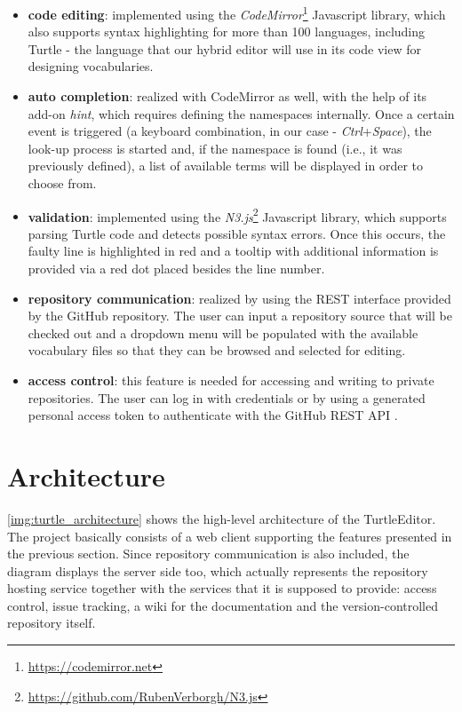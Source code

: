 \begin{itemize}
	\item \textbf{code editing}: implemented using the \textit{CodeMirror}\footnote{\url{https://codemirror.net}} Javascript library, which also supports syntax highlighting for more than 100 languages, including Turtle - the language that our hybrid editor will use in its code view for designing vocabularies.
	\item \textbf{auto completion}: realized with CodeMirror as well, with the help of its add-on \textit{hint}, which requires defining the namespaces internally. Once a certain event is triggered (a keyboard combination, in our case - \textit{Ctrl}+\textit{Space}), the look-up process is started and, if the namespace is found (i.e., it was previously defined), a list of available terms will be displayed in order to choose from.
	\item \textbf{validation}: implemented using the \textit{N3.js}\footnote{\url{https://github.com/RubenVerborgh/N3.js}} Javascript library, which supports parsing Turtle code and detects possible syntax errors. Once this occurs, the faulty line is highlighted in red and a tooltip with additional information is provided via a red dot placed besides the line number.
	\item \textbf{repository communication}: realized by using the REST interface provided by the GitHub repository. The user can input a repository source that will be checked out and a dropdown menu will be populated with the available vocabulary files so that they can be browsed and selected for editing.
	\item \textbf{access control}: this feature is needed for accessing and writing to private repositories. The user can log in with credentials or by using a generated personal access token to authenticate with the GitHub REST API \cite{Petersen2016}.
\end{itemize}


\section {Architecture}

\autoref{img:turtle_architecture} shows the high-level architecture of the TurtleEditor. The project basically consists of a web client supporting the features presented in the previous section. Since repository communication is also included, the diagram displays the server side too, which actually represents the repository hosting service together with the services that it is supposed to provide: access control, issue tracking, a wiki for the documentation and the version-controlled repository itself.


